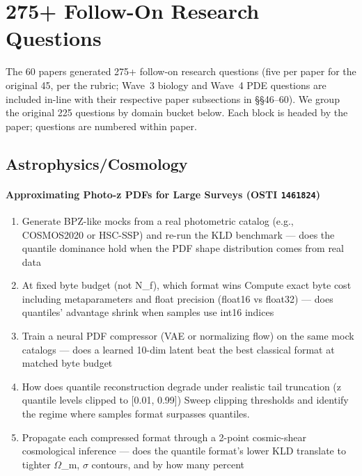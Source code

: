 \clearpage\section{275+ Follow-On Research Questions}
The 60 papers generated 275+ follow-on research questions (five per paper for the original 45, per the rubric; Wave~3 biology and Wave~4 PDE questions are included in-line with their respective paper subsections in \S\S46--60). We group the original 225 questions by domain bucket below. Each block is headed by the paper; questions are numbered within paper.
\subsection*{Astrophysics/Cosmology}
\paragraph{Approximating Photo-z PDFs for Large Surveys \textnormal{\small(OSTI \texttt{1461824})}}
\begin{enumerate}[leftmargin=1.6em,itemsep=0.2em,topsep=0.2em,label=Q\arabic*.]
\item Generate BPZ-like mocks from a real photometric catalog (e.g., COSMOS2020 or HSC-SSP) and re-run the KLD benchmark --- does the quantile dominance hold when the PDF shape distribution comes from real data
\item At fixed byte budget (not N\_f), which format wins Compute exact byte cost including metaparameters and float precision (float16 vs float32) --- does quantiles' advantage shrink when samples use int16 indices
\item Train a neural PDF compressor (VAE or normalizing flow) on the same mock catalogs --- does a learned 10-dim latent beat the best classical format at matched byte budget
\item How does quantile reconstruction degrade under realistic tail truncation (z quantile levels clipped to [0.01, 0.99]) Sweep clipping thresholds and identify the regime where samples format surpasses quantiles.
\item Propagate each compressed format through a 2-point cosmic-shear cosmological inference --- does the quantile format's lower KLD translate to tighter $\Omega$\_m, $\sigma$ contours, and by how many percent
\end{enumerate}
